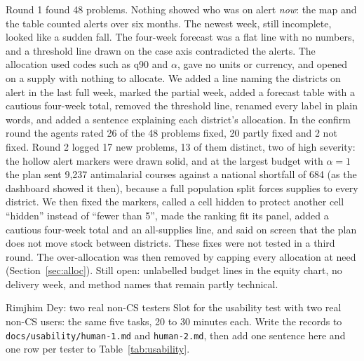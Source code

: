 Round 1 found 48 problems. Nothing showed who was on alert \emph{now}: the map and the table counted alerts
over six months. The newest week, still incomplete, looked like a sudden fall. The four-week forecast was a
flat line with no numbers, and a threshold line drawn on the case axis contradicted the alerts. The allocation
used codes such as q90 and $\alpha$, gave no units or currency, and opened on a supply with nothing to
allocate. We added a line naming the districts on alert in the last full week, marked the partial
week, added a forecast table with a cautious four-week total, removed the threshold line, renamed every label
in plain words, and added a sentence explaining each district's allocation. In the confirm round the agents
rated 26 of the 48 problems fixed, 20 partly fixed and 2 not fixed. Round 2 logged 17 new problems, 13 of them distinct, two of high severity: the hollow alert markers were drawn
solid, and at the largest budget with $\alpha=1$ the plan sent 9,237 antimalarial courses against a national
shortfall of 684 (as the dashboard showed it then), because a full population split forces supplies to every district. We then fixed the
markers, called a cell hidden to protect another cell ``hidden'' instead of ``fewer than 5'', made the ranking
fit its panel, added a cautious four-week total and an all-supplies line, and said on screen that the plan does
not move stock between districts. These fixes were not tested in a third round. The over-allocation
was then removed by capping every allocation at need (Section~\ref{sec:alloc}). Still open: unlabelled budget lines in the equity chart, no
delivery week, and method names that remain partly technical.

\begin{teammate}{Rimjhim Dey: two real non-CS testers}
Slot for the usability test with two real non-CS users: the same five tasks, 20 to 30 minutes each. Write the
records to \texttt{docs/usability/human-1.md} and \texttt{human-2.md}, then add one sentence here and one row
per tester to Table~\ref{tab:usability}.
\end{teammate}
